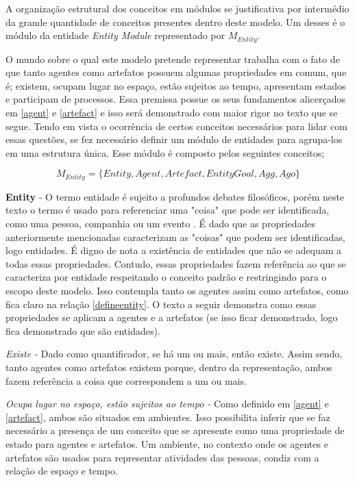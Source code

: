 A organização estrutural dos conceitos em módulos se justificativa por intermédio da grande quantidade de conceitos presentes dentro deste modelo. Um desses é o módulo da entidade \textit{Entity Module} representado por $M_{Entity}$. 

O mundo sobre o qual este modelo pretende representar trabalha com o fato de que tanto agentes como artefatos possuem algumas propriedades em comum, que é; existem, ocupam lugar no espaço, estão sujeitos ao tempo, apresentam estados e participam de processos. Essa premissa possue os seus fundamentos alicerçados em \ref{agent} e \ref{artefact} e isso será demonstrado com maior rigor no texto que se segue. Tendo em vista o ocorrência de certos conceitos necessários para lidar com essas questões, se fez necessário definir um módulo de entidades para agrupa-los em uma estrutura única. Esse módulo é composto pelos seguintes conceitos;

\begin{equation} 
M_{Entity} = \{ Entity, Agent, Artefact, EntityGoal, Agg, Ago\}
\end{equation}\label{modent}

\textbf{Entity} - O termo entidade é sujeito a profundos debates filosóficos, porém neste texto o termo é usado para referenciar uma "coisa" que pode ser identificada, como uma pessoa, companhia ou um evento \cite{entity}. É dado que as propriedades anteriormente mencionadas caracterizam as "coisas" que podem ser identificadas, logo entidades. É digno de nota a existência de entidades que não se adequam a todas essas propriedades. Contudo, essas propriedades fazem referência ao que se caracteriza por entidade respeitando o conceito padrão \cite{entity} e restringindo para o escopo deste modelo. Isso contempla tanto os agentes assim como artefatos, como fica claro na relação \ref{defineentity}. O texto a seguir demonstra como essas propriedades se aplicam a agentes e a artefatos (se isso ficar demonstrado, logo fica demonstrado que são entidades).

\textit{Existe -} Dado como quantificador, se há um ou mais, então existe. Assim sendo, tanto agentes como artefatos existem porque, dentro da representação, ambos fazem referência a coisa que correspondem a um ou mais. 

\textit{Ocupa lugar no espaço, estão sujeitos ao tempo - } Como definido em \ref{agent} e \ref{artefact}, ambos são situados em ambientes. 
Isso possibilita inferir que se faz necessário a presença de um conceito que se apresente como uma propriedade de estado para agentes e artefatos. Um ambiente, no contexto onde os agentes e artefatos são usados para representar atividades das pessoas, condiz com a relação de espaço e tempo. 

